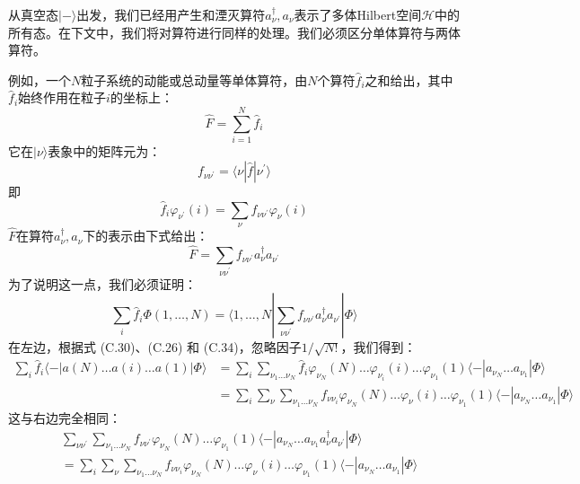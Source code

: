 从真空态$|-\rangle$出发，我们已经用产生和湮灭算符$a^{\dagger}_{\nu},a_{\nu}$表示了多体Hilbert空间$\mathcal{H}$中的所有态。在下文中，我们将对算符进行同样的处理。我们必须区分单体算符与两体算符。

例如，一个$N$粒子系统的动能或总动量等单体算符，由$N$个算符$\hat{f}_{i}$之和给出，其中$\hat{f}_{i}$始终作用在粒子$i$的坐标上：
\begin{equation}
\hat{F}=\sum^{N}_{i=1}\hat{f}_{i}\label{eq:One-body operator}
\end{equation}
它在$|\nu\rangle$表象中的矩阵元为：
\begin{equation}
f_{\nu\nu^{\prime}}=\langle\nu|\hat{f}|\nu^{\prime}\rangle\label{eq:appendix_c_f_matrix_el}
\end{equation}
即
\begin{equation}
\hat{f}_{i}\varphi_{\nu^{\prime}}(i)=\sum_{\nu}f_{\nu\nu^{\prime}}\varphi_{\nu}(i)\label{eq:appendix_c_f_action}
\end{equation}
$\hat{F}$在算符$a^{\dagger}_{\nu},a_{\nu}$下的表示由下式给出：
\begin{equation}
\hat{F}=\sum_{\nu\nu^{\prime}}f_{\nu\nu^{\prime}}a^{\dagger}_{\nu}a_{\nu^{\prime}}\label{eq:appendix_c_one_body_second_quant}
\end{equation}
为了说明这一点，我们必须证明：
\begin{equation}
\sum_{i}\hat{f}_{i}\Phi(1,\dots,N)=\langle1,\dots,N|\sum_{\nu\nu^{\prime}}f_{\nu\nu^{\prime}}a^{\dagger}_{\nu}a_{\nu^{\prime}}|\Phi\rangle\label{eq:appendix_c_one_body_proof_eq}
\end{equation}
在左边，根据式 (C.30)、(C.26) 和 (C.34)，忽略因子$1/\sqrt{N!}$，我们得到：
\begin{align}
\sum_{i}\hat{f}_{i}\langle-|a(N)\dots a(i)\dots a(1)|\Phi\rangle & =\sum_{i}\sum_{\nu_{1}\dots\nu_{N}}\hat{f}_{i}\varphi_{\nu_{N}}(N)\dots\varphi_{\nu_{i}}(i)\dots\varphi_{\nu_{1}}(1)\langle-|a_{\nu_{N}}\dots a_{\nu_{1}}|\Phi\rangle\nonumber \\
 & =\sum_{i}\sum_{\nu}\sum_{\nu_{1}\dots\nu_{N}}f_{\nu\nu_{i}}\varphi_{\nu_{N}}(N)\dots\varphi_{\nu}(i)\dots\varphi_{\nu_{1}}(1)\langle-|a_{\nu_{N}}\dots a_{\nu_{1}}|\Phi\rangle\label{eq:appendix_c_one_body_lhs}
\end{align}
这与右边完全相同：
\begin{align}
 & \sum_{\nu\nu^{\prime}}\sum_{\nu_{1}\dots\nu_{N}}f_{\nu\nu^{\prime}}\varphi_{\nu_{N}}(N)\dots\varphi_{\nu_{1}}(1)\langle-|a_{\nu_{N}}\dots a_{\nu_{1}}a^{\dagger}_{\nu}a_{\nu^{\prime}}|\Phi\rangle\nonumber \\
 & =\sum_{i}\sum_{\nu}\sum_{\nu_{1}\dots\nu_{N}}f_{\nu\nu_{i}}\varphi_{\nu_{N}}(N)\dots\varphi_{\nu}(i)\dots\varphi_{\nu_{1}}(1)\langle-|a_{\nu_{N}}\dots a_{\nu_{1}}|\Phi\rangle\label{eq:appendix_c_one_body_rhs}
\end{align}

